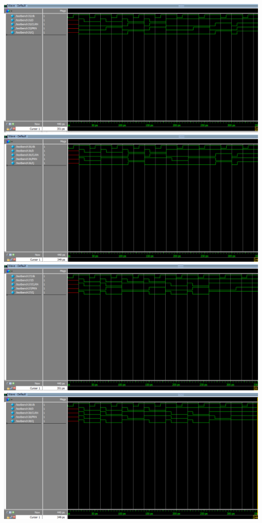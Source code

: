 \documentclass[a4paper]{jarticle}
\begin{document}
\includegraphics[width=15cm]{work13/13-m-3-5.PNG}\\
\includegraphics[width=15cm]{work13/13-m-3-6.PNG}\\
\includegraphics[width=15cm]{work13/13-m-3-7.PNG}\\
\includegraphics[width=15cm]{work13/13-m-3-8.PNG}\\
\end{document}
